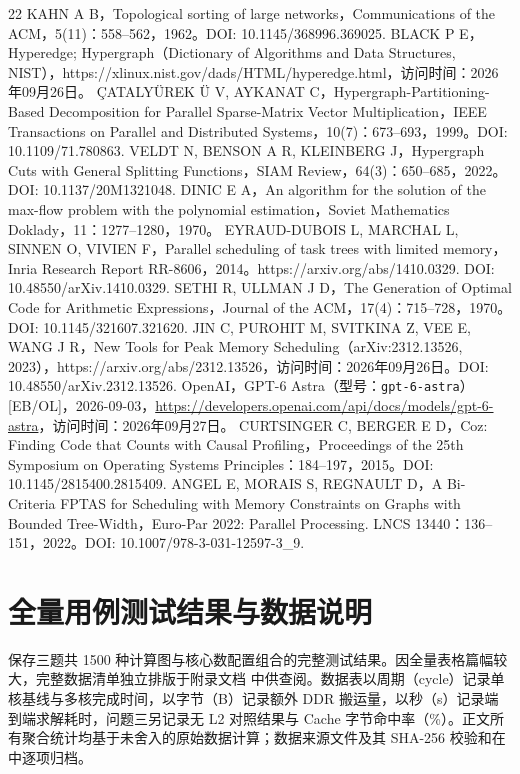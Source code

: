 \documentclass[anonymous,withtoc]{gmcm2026}
\begin{document}
\begin{thebibliography}{22}
 KAHN A B，Topological sorting of large networks，Communications of the ACM，5(11)：558--562，1962。DOI: 10.1145/368996.369025.
 BLACK P E，Hyperedge; Hypergraph（Dictionary of Algorithms and Data Structures, NIST），https://xlinux.nist.gov/dads/HTML/hyperedge.html，访问时间：2026年09月26日。
 ÇATALYÜREK Ü V, AYKANAT C，Hypergraph-Partitioning-Based Decomposition for Parallel Sparse-Matrix Vector Multiplication，IEEE Transactions on Parallel and Distributed Systems，10(7)：673--693，1999。DOI: 10.1109/71.780863.
 VELDT N, BENSON A R, KLEINBERG J，Hypergraph Cuts with General Splitting Functions，SIAM Review，64(3)：650--685，2022。DOI: 10.1137/20M1321048.
 DINIC E A，An algorithm for the solution of the max-flow problem with the polynomial estimation，Soviet Mathematics Doklady，11：1277--1280，1970。
 EYRAUD-DUBOIS L, MARCHAL L, SINNEN O, VIVIEN F，Parallel scheduling of task trees with limited memory，Inria Research Report RR-8606，2014。https://arxiv.org/abs/1410.0329. DOI: 10.48550/arXiv.1410.0329.
 SETHI R, ULLMAN J D，The Generation of Optimal Code for Arithmetic Expressions，Journal of the ACM，17(4)：715--728，1970。DOI: 10.1145/321607.321620.
 JIN C, PUROHIT M, SVITKINA Z, VEE E, WANG J R，New Tools for Peak Memory Scheduling（arXiv:2312.13526, 2023），https://arxiv.org/abs/2312.13526，访问时间：2026年09月26日。DOI: 10.48550/arXiv.2312.13526.
 OpenAI，GPT-6 Astra（型号：\texttt{gpt-6-astra}）[EB/OL]，2026-09-03，\url{https://developers.openai.com/api/docs/models/gpt-6-astra}，访问时间：2026年09月27日。
 CURTSINGER C, BERGER E D，Coz: Finding Code that Counts with Causal Profiling，Proceedings of the 25th Symposium on Operating Systems Principles：184--197，2015。DOI: 10.1145/2815400.2815409.
 ANGEL E, MORAIS S, REGNAULT D，A Bi-Criteria FPTAS for Scheduling with Memory Constraints on Graphs with Bounded Tree-Width，Euro-Par 2022: Parallel Processing. LNCS 13440：136--151，2022。DOI: 10.1007/978-3-031-12597-3\_9.
\end{thebibliography}

\appendix
\section{全量用例测试结果与数据说明}

\texttt{} 保存三题共 1500 种计算图与核心数配置组合的完整测试结果。因全量表格篇幅较大，完整数据清单独立排版于附录文档 \texttt{} 中供查阅。数据表以周期（cycle）记录单核基线与多核完成时间，以字节（B）记录额外 DDR 搬运量，以秒（s）记录端到端求解耗时，问题三另记录无 L2 对照结果与 Cache 字节命中率（\%）。正文所有聚合统计均基于未舍入的原始数据计算；数据来源文件及其 SHA-256 校验和在 \texttt{} 中逐项归档。
\end{document}
